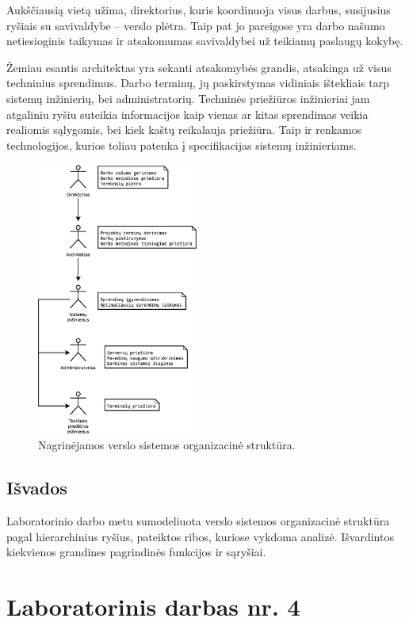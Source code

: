 \documentclass[10pt]{IEEEtran}
\begin{document}
            Aukščiausią vietą užima, direktorius, kuris koordinuoja visus darbus, susijusius ryšiais su savivaldybe -- verslo plėtra. Taip pat jo pareigose yra darbo našumo netiesioginis taikymas ir atsakomumas savivaldybei už teikiamų paslaugų kokybę.

            Žemiau esantis architektas yra sekanti atsakomybės grandis, atsakinga už visus techninius sprendimus. Darbo terminų, jų paskirstymas vidiniais ištekliais tarp sistemų inžinierių, bei administratorių. Techninės priežiūros inžinieriai jam atgaliniu ryšiu suteikia informacijos kaip vienas ar kitas sprendimas veikia realiomis sąlygomis, bei kiek kaštų reikalauja priežiūra. Taip ir renkamos technologijos, kurios toliau patenka į specifikacijas sistemų inžinieriams.

            \begin{figure}
                \centering
                \includegraphics[width=200px]{figures/hierarchija.eps}
                \caption{Nagrinėjamos verslo sistemos organizacinė struktūra.}
                \label{fig:hierarchija}
            \end{figure}

        \subsection{Išvados}

            Laboratorinio darbo metu sumodeliuota verslo sistemos organizacinė struktūra pagal hierarchinius ryšius, pateiktos ribos, kuriose vykdoma analizė. Išvardintos kiekvienos grandines pagrindinės funkcijos ir sąryšiai.

    \section{Laboratorinis darbas nr. 4}
\end{document}
